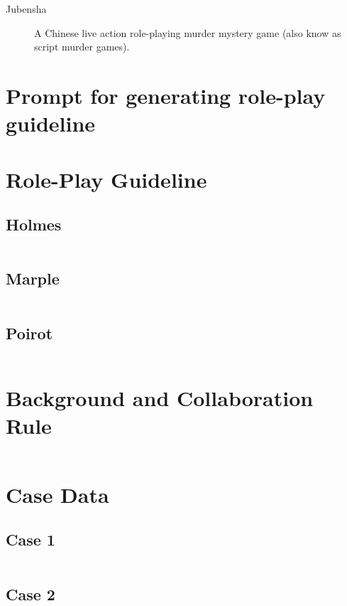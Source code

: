 \documentclass{article}
\begin{document}
\begin{appendices}
\begin{description}
\item[Jubensha]
A Chinese live action role-playing murder mystery game (also know as script murder games).

\end{description}



\section{Prompt for generating role-play guideline} \label{sec:app_gen_persona}

\section{Role-Play Guideline} \label{sec:app_char_prompt}

\subsection{Holmes}
    \inputminted{yaml}{../prompts/holmes.yaml}

\subsection{Marple}
    \inputminted{yaml}{../prompts/marple.yaml}
    
\subsection{Poirot}
    \inputminted{yaml}{../prompts/poirot.yaml}


\section{Background and Collaboration Rule} \label{sec:app_rule_prompt}
    \inputminted{yaml}{../prompts/rule_collab.yaml}


\section{Case Data} \label{sec:app_case}

\subsection{Case 1} \label{sec:app_case1}
    \inputminted{yaml}{../cases/case1.yaml}
\subsection{Case 2} \label{sec:app_case2}
    \inputminted{yaml}{../cases/case2.yaml}

\end{appendices}
\end{document}
